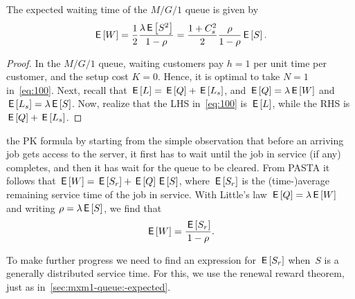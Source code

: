 \documentclass[stochastic-or.tex]{subfiles}
\begin{document}
\begin{theorem}
The expected waiting time of the $M/G/1$ queue is given by
\begin{equation*}
 \,\mathsf{E}\left[W\right] = \frac 1 2 \frac{\lambda \,\mathsf{E}\left[S^2\right]}{1-\rho} =\frac{1 + C_s^2}2 \frac{\rho}{1-\rho} \,\mathsf{E}\left[S\right].
\end{equation*}
\end{theorem}
\begin{proof}
In the $M/G/1$ queue, waiting customers pay $h=1$ per unit time per customer, and the setup cost $K=0$. Hence, it is optimal to take $N=1$ in~\cref{eq:100}.
Next, recall that $\,\mathsf{E}\left[L\right] = \,\mathsf{E}\left[Q\right] + \,\mathsf{E}\left[L_s\right]$, and $\,\mathsf{E}\left[Q\right] = \lambda \,\mathsf{E}\left[W\right]$ and $\,\mathsf{E}\left[L_s\right] = \lambda \,\mathsf{E}\left[S\right]$. Now,  realize that the LHS in~\cref{eq:100} is $\,\mathsf{E}\left[L\right]$, while the RHS is $\,\mathsf{E}\left[Q\right] + \,\mathsf{E}\left[L_s\right]$.
\end{proof}


 the PK formula by starting from the simple observation that before an arriving job gets access to the server, it first has to wait until the job in service (if any) completes, and then it has wait for the queue to be cleared.
From PASTA it follows that $\,\mathsf{E}\left[W\right] = \,\mathsf{E}\left[S_r\right] + \,\mathsf{E}\left[Q\right] \,\mathsf{E}\left[S\right]$, where $\,\mathsf{E}\left[S_r\right]$ is the (time-)average remaining service time of the job in service.
With Little's law $\,\mathsf{E}\left[Q\right] = \lambda \,\mathsf{E}\left[W\right]$ and writing $\rho = \lambda \,\mathsf{E}\left[S\right]$, we find that
\begin{equation*}
 \,\mathsf{E}\left[W\right] = \frac{\,\mathsf{E}\left[S_r\right]}{1-\rho}.
\end{equation*}

To make further progress we need to find an expression for $\,\mathsf{E}\left[S_r\right]$ when~$S$ is a generally distributed service time.
For this, we use the renewal reward theorem, just as in~\cref{sec:mxm1-queue:-expected}.
\end{document}
